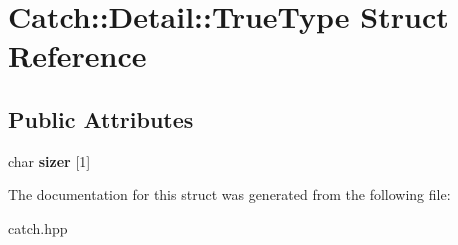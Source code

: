 \hypertarget{structCatch_1_1Detail_1_1TrueType}{}\section{Catch\+:\+:Detail\+:\+:True\+Type Struct Reference}
\label{structCatch_1_1Detail_1_1TrueType}
\subsection*{Public Attributes}
\begin{DoxyCompactItemize}
\item 
\mbox{\label{structCatch_1_1Detail_1_1TrueType_a3aaaeb75909e668b293c8a81f5fb6419}} 
char {\bfseries sizer} \mbox{[}1\mbox{]}
\end{DoxyCompactItemize}


The documentation for this struct was generated from the following file\+:\begin{DoxyCompactItemize}
\item 
catch.\+hpp\end{DoxyCompactItemize}
